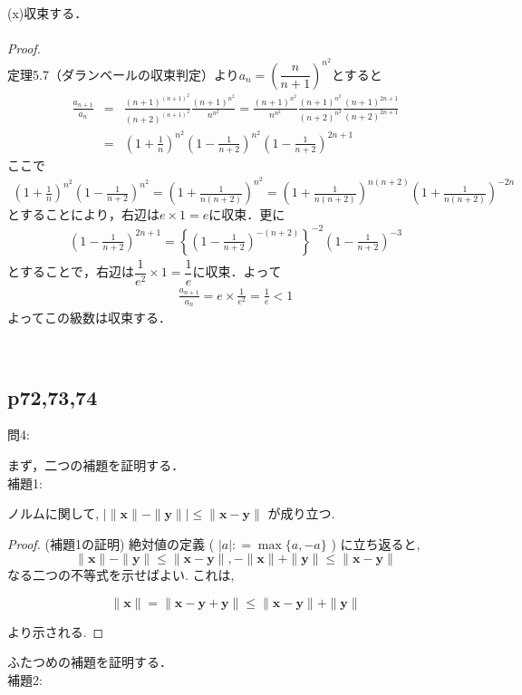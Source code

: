 \documentclass[dvipdfmx,uplatex,11pt]{jsarticle}
\begin{document}
	\begin{screen}
	(x)収束する．\\
	\dotfill \\
	{\it Proof.}\\
	定理5.7（ダランベールの収束判定）より$a_n=\left(\dfrac{n}{n+1}\right)^{n^2}$とすると
	\begin{eqnarray*}
	\frac{a_{n+1}}{a_n}&=&\frac{(n+1)^{(n+1)^2}}{(n+2)^{(n+1)^2}}\frac{(n+1)^{n^2}}{n^{n^2}}=\frac{(n+1)^{n^2}}{n^{n^2}}\frac{(n+1)^{n^2}}{(n+2)^{n^2}}\frac{(n+1)^{2n+1}}{(n+2)^{2n+1}}\\
	&=&\left(1+\frac{1}{n}\right)^{n^2}\left(1-\frac{1}{n+2}\right)^{n^2}\left(1-\frac{1}{n+2}\right)^{2n+1}
	\end{eqnarray*}
	ここで
	\begin{eqnarray*}
	\left(1+\frac{1}{n}\right)^{n^2}\left(1-\frac{1}{n+2}\right)^{n^2}=\left(1+\frac{1}{n(n+2)}\right)^{n^2}=\left(1+\frac{1}{n(n+2)}\right)^{n(n+2)}\left(1+\frac{1}{n(n+2)}\right)^{-2n}
	\end{eqnarray*}
	$とすることにより，右辺はe \times 1=eに収束．更に$
	\begin{eqnarray*}
	\left(1-\frac{1}{n+2}\right)^{2n+1}=\left\{\left(1-\frac{1}{n+2}\right)^{-(n+2)}\right\}^{-2}\left(1-\frac{1}{n+2}\right)^{-3}
	\end{eqnarray*}
	$とすることで，右辺は\dfrac{1}{e^2} \times 1=\dfrac{1}{e}に収束．よって$
	\begin{eqnarray*}
	\frac{a_{n+1}}{a_n}=e \times \frac{1}{e^2}=\frac{1}{e}<1
	\end{eqnarray*}
	よってこの級数は収束する．
\end{screen}

​\newpage
\subsection{p72,73,74}
問4:\par 
まず，二つの補題を証明する．\\
補題1:\par 
	ノルムに関して, $| \| \bm x  \|- \| \bm y \| | \leq \| \bm x - \bm y \|$ が成り立つ. 
\begin{proof} (補題1の証明)
	絶対値の定義 ( $| a | : = \max \{ a , -a \}$ ) に立ち返ると, 
%		
		\[
			\| \bm x  \|- \| \bm y \| \leq \| \bm x - \bm y \| , - \| \bm x  \| + \| \bm y \| \leq \| \bm x - \bm y \|
		\]
%		
	なる二つの不等式を示せばよい. これは, 
		
		\[
			\| \bm x \| = \| \bm x - \bm y + \bm y \| \leq \| \bm x - \bm y \| + \| \bm y \|
		\]
		
	より示される.
\end{proof}
ふたつめの補題を証明する．\\
補題2:\par 
	
\end{document}
